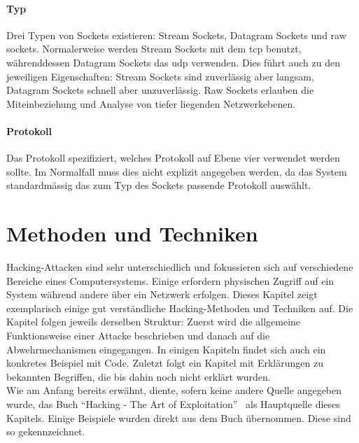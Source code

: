 \documentclass[11pt, a4paper]{article}
\begin{document}
\paragraph{Typ}
Drei Typen von Sockets existieren: Stream Sockets, Datagram Sockets und raw sockets. Normalerweise werden Stream Sockets mit dem \gls{tcp} benutzt, währenddessen Datagram Sockets das \gls{udp} verwenden. Dies führt auch zu den jeweiligen Eigenschaften: Stream Sockets sind zuverlässig aber langsam, Datagram Sockets schnell aber unzuverlässig. Raw Sockets erlauben die Miteinbeziehung und Analyse von tiefer liegenden Netzwerkebenen. 
\paragraph{Protokoll}
Das Protokoll spezifiziert, welches Protokoll auf Ebene vier verwendet werden sollte. Im Normalfall muss dies nicht explizit angegeben werden, da das System standardmässig das zum Typ des Sockets passende Protokoll auswählt.




\newpage
\section{Methoden und Techniken}\label{sec:methoden-und-techniken}
Hacking-Attacken sind sehr unterschiedlich und fokussieren sich auf verschiedene Bereiche eines Computersystems. Einige erfordern physischen Zugriff auf ein System während andere über ein Netzwerk erfolgen. Dieses Kapitel zeigt exemplarisch einige gut verständliche Hacking-Methoden und Techniken auf. Die Kapitel folgen jeweils derselben Struktur: Zuerst wird die allgemeine Funktionsweise einer Attacke beschrieben und danach auf die Abwehrmechanismen eingegangen. In einigen Kapiteln findet sich auch ein konkretes Beispiel mit Code. Zuletzt folgt ein Kapitel mit Erklärungen zu bekannten Begriffen, die bis dahin noch nicht erklärt wurden. \\Wie am Anfang bereits erwähnt, diente, sofern keine andere Quelle angegeben wurde, das Buch ``Hacking - The Art of Exploitation''~\cite{erickson2008hacking} als Hauptquelle dieses Kapitels. Einige Beispiele wurden direkt aus dem Buch übernommen. Diese sind so gekennzeichnet.
\end{document}
